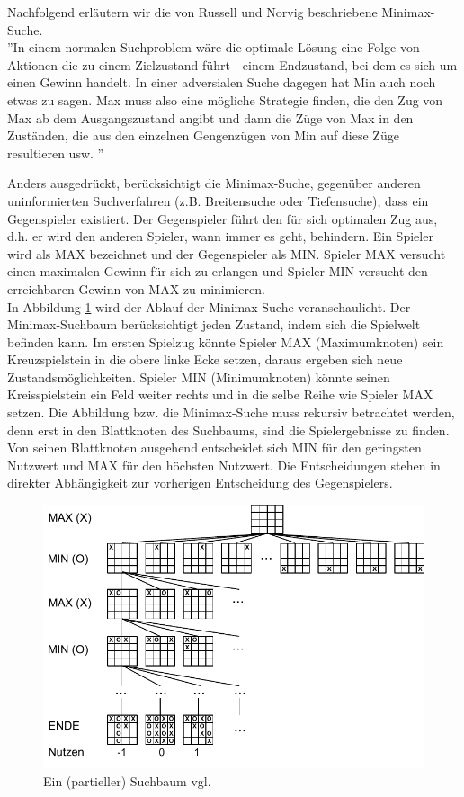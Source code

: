Nachfolgend erläutern wir die von Russell und Norvig beschriebene Minimax-Suche. \\

''In einem normalen Suchproblem wäre die optimale Lösung eine Folge von Aktionen die zu einem Zielzustand führt - einem Endzustand, bei dem es sich um einen Gewinn handelt. In einer adversialen Suche dagegen hat Min auch noch etwas zu sagen. Max muss also eine mögliche Strategie finden, die den Zug von Max ab dem Ausgangszustand angibt und dann die Züge von Max in den Zuständen, die aus den einzelnen Gengenzügen von Min auf diese Züge resultieren usw. \cite[208]{Russell}''

Anders ausgedrückt, berücksichtigt die Minimax-Suche, gegenüber anderen uninformierten Suchverfahren (z.B. Breitensuche oder Tiefensuche), dass ein Gegenspieler existiert. Der Gegenspieler führt den für sich optimalen Zug aus, d.h. er wird den anderen Spieler, wann immer es geht, behindern. Ein Spieler wird als MAX bezeichnet und der Gegenspieler als MIN. Spieler MAX versucht einen maximalen Gewinn für sich zu erlangen und Spieler MIN versucht den erreichbaren Gewinn von MAX zu minimieren.\\

In Abbildung \ref{fig:minimax_tictactoe} wird der Ablauf der Minimax-Suche veranschaulicht. Der Minimax-Suchbaum berücksichtigt jeden Zustand, indem sich die Spielwelt befinden kann. Im ersten Spielzug könnte Spieler MAX (Maximumknoten) sein Kreuzspielstein in die obere linke Ecke setzen, daraus ergeben sich neue Zustandsmöglichkeiten. Spieler MIN (Minimumknoten) könnte seinen Kreisspielstein ein Feld weiter rechts und in die selbe Reihe wie Spieler MAX setzen. Die Abbildung bzw. die Minimax-Suche muss rekursiv betrachtet werden, denn erst in den Blattknoten des Suchbaums, sind die Spielergebnisse zu finden. Von seinen Blattknoten ausgehend entscheidet sich MIN für den geringsten Nutzwert und MAX für den höchsten Nutzwert. Die Entscheidungen stehen in direkter Abhängigkeit zur vorherigen Entscheidung des Gegenspielers. \\
  
\begin{figure}[!htbp]
  \centering
  \includegraphics{inhalt/abbildungen/minimax_tictactoe.pdf}
  \caption{Ein (partieller) Suchbaum vgl. \cite[208]{Russell}}
  \label{fig:minimax_tictactoe}
\end{figure} 

